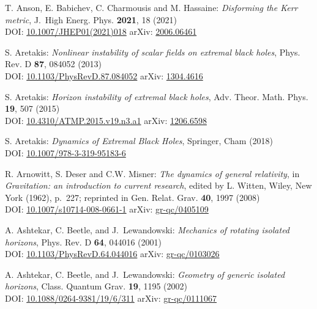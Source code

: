 \begin{thebibliography}{123}
T. Anson, E. Babichev, C. Charmousis and M. Hassaine:
{\em Disforming the Kerr metric},
J.~High Energ. Phys. {\bf 2021}, 18 (2021)\\
DOI: \href{https://doi.org/10.1007/JHEP01(2021)018}{10.1007/JHEP01(2021)018}\hfill
arXiv: \href{https://arxiv.org/abs/2006.06461}{2006.06461}

S. Aretakis:
{\em Nonlinear instability of scalar fields on extremal black holes},
Phys. Rev. D {\bf 87}, 084052 (2013)\\
DOI: \href{https://doi.org/10.1103/PhysRevD.87.084052}{10.1103/PhysRevD.87.084052}\hfill
arXiv: \href{https://arxiv.org/abs/1304.4616}{1304.4616}

S. Aretakis:
{\em Horizon instability of extremal black holes},
Adv. Theor. Math. Phys. {\bf 19}, 507 (2015)\\
DOI: \href{https://doi.org/10.4310/ATMP.2015.v19.n3.a1}{10.4310/ATMP.2015.v19.n3.a1}\hfill
arXiv: \href{https://arxiv.org/abs/1206.6598}{1206.6598}

S. Aretakis:
{\em Dynamics of Extremal Black Holes},
Springer, Cham (2018)\\
DOI: \href{https://doi.org/10.1007/978-3-319-95183-6}{10.1007/978-3-319-95183-6}

R. Arnowitt, S. Deser and C.W. Misner:
{\em The dynamics of general relativity},
in {\em Gravitation: an introduction to current research},
edited by L. Witten,
Wiley, New York (1962), p.~227; reprinted in
Gen. Relat. Grav. {\bf 40}, 1997 (2008)\\
DOI: \href{https://doi.org/10.1007/s10714-008-0661-1}{10.1007/s10714-008-0661-1}\hfill
arXiv: \href{https://arxiv.org/abs/gr-qc/0405109}{gr-qc/0405109}

A. Ashtekar, C. Beetle, and J.~Lewandowski:
{\em Mechanics of rotating isolated horizons},
Phys. Rev. D {\bf 64}, 044016 (2001)\\
DOI: \href{https://doi.org/10.1103/PhysRevD.64.044016}{10.1103/PhysRevD.64.044016}\hfill
arXiv: \href{https://arxiv.org/abs/gr-qc/0103026}{gr-qc/0103026}

A. Ashtekar, C. Beetle, and J.~Lewandowski:
{\em Geometry of generic isolated horizons},
Class. Quantum Grav. {\bf 19}, 1195 (2002)\\
DOI: \href{https://doi.org/10.1088/0264-9381/19/6/311}{10.1088/0264-9381/19/6/311}\hfill
arXiv: \href{https://arxiv.org/abs/gr-qc/0111067}{gr-qc/0111067}


\end{thebibliography}
